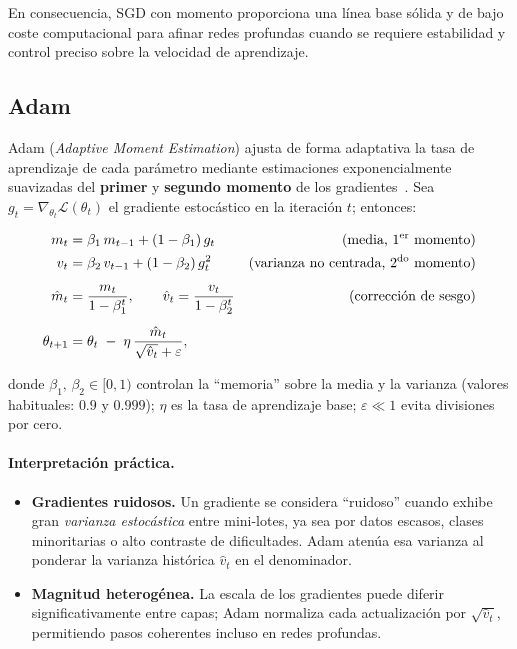 En consecuencia, SGD con momento proporciona una línea base sólida y de bajo coste computacional para afinar redes profundas cuando se requiere estabilidad y control preciso sobre la velocidad de aprendizaje.

\subsection*{Adam}

Adam (\emph{Adaptive Moment Estimation}) ajusta de forma adaptativa la tasa de aprendizaje de cada parámetro mediante estimaciones exponencialmente suavizadas del \textbf{primer} y \textbf{segundo momento} de los gradientes~\cite{kingma2015adam}.
Sea \(g_t=\nabla_{\theta_t}\mathcal{L}(\theta_t)\) el gradiente estocástico en la iteración \(t\); entonces:

\[
\begin{aligned}
m_t      &= \beta_1\,m_{t-1} + (1-\beta_1)\,g_t &\text{(media, 1\textsuperscript{er} momento)}\\
v_t      &= \beta_2\,v_{t-1} + (1-\beta_2)\,g_t^{2} &\text{(varianza no centrada, 2\textsuperscript{do} momento)}\\[0.5em]
\hat{m}_t &= \frac{m_t}{1-\beta_1^{t}} , \qquad
\hat{v}_t = \frac{v_t}{1-\beta_2^{t}} &\text{(corrección de sesgo)}\\[0.5em]
\theta_{t+1} &= \theta_t \;-\; \eta \,\frac{\hat{m}_t}{\sqrt{\hat{v}_t} + \varepsilon},
\end{aligned}
\]

donde
\(\beta_1,\,\beta_2\in[0,1)\) controlan la “memoria” sobre la media y la varianza (valores habituales: \(0.9\) y \(0.999\));
\(\eta\) es la tasa de aprendizaje base;
\(\varepsilon\!\ll\!1\) evita divisiones por cero.

\paragraph{Interpretación práctica.}
\begin{itemize}
  \item \textbf{Gradientes ruidosos.} Un gradiente se considera “ruidoso” cuando exhibe gran \emph{varianza estocástica} entre mini-lotes, ya sea por datos escasos, clases minoritarias o alto contraste de dificultades. Adam atenúa esa varianza al ponderar la varianza histórica \(\hat{v}_t\) en el denominador.
  \item \textbf{Magnitud heterogénea.} La escala de los gradientes puede diferir significativamente entre capas; Adam normaliza cada actualización por \(\sqrt{\hat{v}_t}\), permitiendo pasos coherentes incluso en redes profundas.
\end{itemize}

